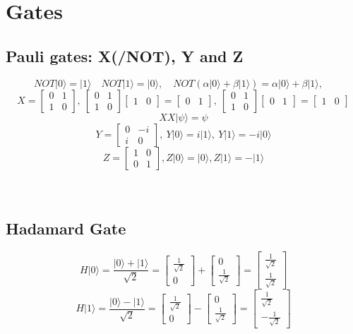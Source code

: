 \documentclass[11pt, fleqn]{article}
\begin{document}
\section{Gates}
\subsection{Pauli gates: X(/NOT), Y and Z}
\[ NOT|0\rangle = |1\rangle \quad NOT|1\rangle = |0\rangle,\quad NOT (\alpha|0\rangle+\beta|1\rangle)=\alpha|0\rangle+\beta|1\rangle,\quad\]
\[X =\begin{bmatrix}0 & 1\\1 & 0\end{bmatrix},\:
\begin{bmatrix}0 & 1\\1 & 0\end{bmatrix}\begin{bmatrix} 1&0\end{bmatrix}=\begin{bmatrix} 0&1\end{bmatrix},\:
\begin{bmatrix}0 & 1\\1 & 0\end{bmatrix}\begin{bmatrix} 0&1\end{bmatrix}=\begin{bmatrix} 1&0\end{bmatrix}\]
\[XX|\psi\rangle=\psi\]
\[Y=\begin{bmatrix}0&-i\\i&0\end{bmatrix},\:Y|0\rangle = i|1\rangle,\:Y|1\rangle =-i|0\rangle\]
\[Z=\begin{bmatrix}1&0\\0&1\end{bmatrix},Z|0\rangle = |0\rangle,Z|1\rangle =-|1\rangle\]
\\~\\
\subsection{Hadamard Gate}
\[H|0\rangle = \frac{|0\rangle +|1\rangle}{\sqrt 2}=\begin{bmatrix}\frac{1}{\sqrt 2}\\0\end{bmatrix}+
\begin{bmatrix}0\\\frac{1}{\sqrt 2}\end{bmatrix}=
\begin{bmatrix}\frac{1}{\sqrt 2}\\\frac{1}{\sqrt 2}\end{bmatrix}\]
\[H|1\rangle = \frac{|0\rangle -|1\rangle}{\sqrt 2}=
\begin{bmatrix}\frac{1}{\sqrt 2}\\0\end{bmatrix}-
\begin{bmatrix}0\\\frac{1}{\sqrt 2}\end{bmatrix}=
\begin{bmatrix}\frac{1}{\sqrt 2}\\-\frac{1}{\sqrt 2}\end{bmatrix}
\]
\end{document}
